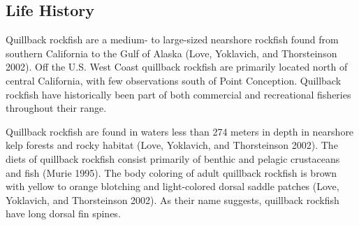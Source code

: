 \documentclass[11pt,
  english,
  a4paper,
]{article}
\begin{document}
\leavevmode\tagmcend\tagstructend\par


\hypertarget{life-history}{%
\subsection{Life History}\label{life-history}}

\leavevmode\tagmcend\tagstructend


Quillback rockfish are a medium- to large-sized nearshore rockfish found from southern California to the Gulf of Alaska {(Love, Yoklavich, and Thorsteinson 2002)\leavevmode\tagmcend\tagstructend}. Off the U.S. West Coast quillback rockfish are primarily located north of central California, with few observations south of Point Conception. Quillback rockfish have historically been part of both commercial and recreational fisheries throughout their range.

\leavevmode\tagmcend\tagstructend\par


Quillback rockfish are found in waters less than 274 meters in depth in nearshore kelp forests and rocky habitat {(Love, Yoklavich, and Thorsteinson 2002)\leavevmode\tagmcend\tagstructend}. The diets of quillback rockfish consist primarily of benthic and pelagic crustaceans and fish {(Murie 1995)\leavevmode\tagmcend\tagstructend}. The body coloring of adult quillback rockfish is brown with yellow to orange blotching and light-colored dorsal saddle patches {(Love, Yoklavich, and Thorsteinson 2002)\leavevmode\tagmcend\tagstructend}. As their name suggests, quillback rockfish have long dorsal fin spines.

\leavevmode\tagmcend\tagstructend\par

\end{document}

